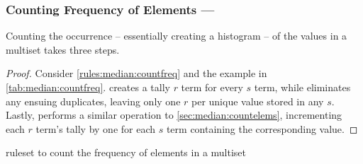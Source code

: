 \subsubsection{Counting Frequency of Elements --- }\label{sec:median:countfreq}

\begin{proposition}\label{prop:median:countfreq}
Counting the occurrence -- essentially creating a histogram -- of the values in a multiset takes three steps.
\end{proposition}

\begin{proof}
Consider \cref{rules:median:countfreq} and the example in \cref{tab:median:countfreq}.   creates a tally \(r\) term for every \(s\) term, while  eliminates any ensuing duplicates, leaving only one \(r\) per unique value stored in any \(s\).  Lastly,  performs a similar operation to \cref{sec:median:countelems}, incrementing each \(r\) term's tally by one for each \(s\) term containing the corresponding value.
\end{proof}

\begin{cprulesetfloat}
\begin{cpruleset}


\end{cpruleset}
\caption{\label{rules:median:countfreq}\Gls{ruleset} to count the frequency of elements in a multiset}
\end{cprulesetfloat}

